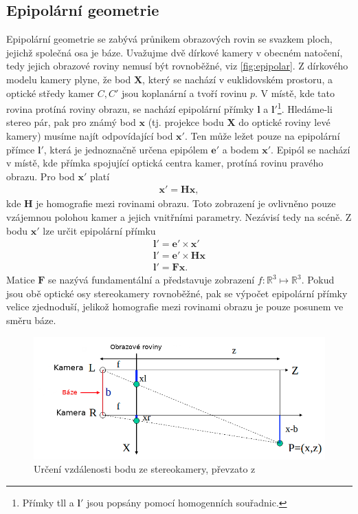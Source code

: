 \documentclass[twoside]{ctuthesis}
\newcommand{\tl}[1]{$\mathbf{#1}$}
\begin{document}
\subsection{Epipolární geometrie}
\label{Sec:epipolar}
Epipolární geometrie se zabývá průnikem obrazových rovin se svazkem ploch, jejichž společná osa je báze. Uvažujme dvě dírkové kamery v obecném natočení, tedy jejich obrazové roviny nemusí být rovnoběžné, viz \ref{fig:epipolar}. Z dírkového modelu kamery plyne, že bod \tl{X}, který se nachází v euklidovském prostoru, a optické středy kamer $C, C'$ jsou koplanární a tvoří rovinu $p$. V místě, kde tato rovina protíná roviny obrazu, se nachází epipolární přímky \tl{l} a $\mathbf{l'}$\footnote{Přímky tl{l} a \tl{l'} jsou popsány pomocí homogenních souřadnic.}. Hledáme-li stereo pár, pak pro známý bod \tl{x} (tj. projekce bodu \tl{X} do optické roviny levé kamery) musíme najít odpovídající bod \tl{x'}. Ten může ležet pouze na epipolární přímce \tl{l'}, která je jednoznačně určena epipólem \tl{e'} a bodem \tl{x'}. Epipól se nachází v místě, kde přímka spojující optická centra kamer, protíná rovinu pravého obrazu. Pro bod \tl{x'} platí
\begin{align}
    \mathbf{x'} = \mathbf{Hx},
\end{align}
kde \tl{H} je homografie mezi rovinami obrazu. Toto zobrazení je ovlivněno pouze vzájemnou polohou kamer a jejich vnitřními parametry. Nezávisí tedy na scéně.
Z bodu \tl{x'} lze určit epipolární přímku 
\begin{align}
    \mathbf{l'} = \mathbf{e'} \times \mathbf{x'} \\
    \mathbf{l'} = \mathbf{e'} \times \mathbf{Hx} \\
    \mathbf{l'} = \mathbf{Fx}.
\end{align}    
Matice \tl{F} se nazývá fundamentální a představuje zobrazení $f:\mathbb{R}^3 \mapsto \mathbb{R}^3$.
Pokud jsou obě optické osy stereokamery rovnoběžné, pak se výpočet epipolární přímky velice zjednoduší, jelikož homografie mezi rovinami obrazu je pouze posunem ve směru báze. \cite{hartley2004multiple}
\begin{figure}
    \centering
    \includegraphics[width = 0.8\linewidth]{pictures/stereo_sketch.png}
    \caption{Určení vzdálenosti bodu ze stereokamery, převzato z \cite{washingtion_steropic}}
    \label{stereo_paralel}
\end{figure}
\end{document}
